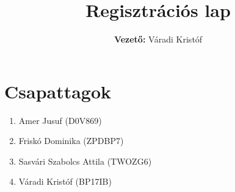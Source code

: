 \documentclass[11pt]{article}
\title{\RaggedRight\Large \textbf{Regisztrációs lap}}
\author{\textbf{Vezető:} Váradi Kristóf}
\date{}
\begin{document}
\maketitle


{\RaggedRight
\section*{Csapattagok}

\begin{enumerate}[label=\arabic*.,leftmargin=*]
    \item Amer Jusuf (D0V869)
    \item Friskó Dominika (ZPDBP7)
    \item Sasvári Szabolcs Attila (TWOZG6)
    \item Váradi Kristóf (BP17IB)
\end{enumerate}

}
\end{document}
